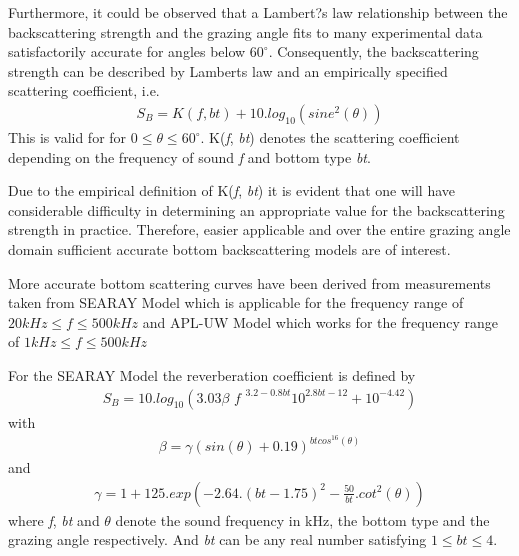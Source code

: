 \noindent Furthermore, it could be observed that a Lambert?s law relationship between the backscattering strength and the grazing angle fits to many experimental data satisfactorily accurate for angles below $60^{\circ}$. Consequently, the backscattering strength can be described by Lambert\textsc{}s law and an empirically specified scattering coefficient, i.e.
\begin{align}
 {S_B}  = K ( \textit{f}, \textit{bt}) + 10 . log_{10}( sine^{2}(\theta)) 
 \end{align}
 \noindent This is valid for for $0 \leq \theta \leq 60^{\circ}$. K(\textit{f}, \textit{bt}) denotes the scattering coefficient depending on the frequency of sound \textit{f} and bottom type \textit{bt}.
 
\noindent Due to the empirical definition of K(\textit{f}, \textit{bt}) it is evident that one will have considerable difficulty in determining an appropriate value for the backscattering strength in practice. Therefore, easier applicable and over the entire grazing angle domain sufficient accurate bottom backscattering models are of interest.

\noindent More accurate bottom scattering curves have been derived from measurements taken from SEARAY Model which is applicable for the frequency range of $20 kHz \leq \textit{f} \leq 500 kHz$ and APL-UW Model which works for the frequency range of $1 kHz \leq \textit{f} \leq 500 kHz$

\noindent For the SEARAY Model the reverberation coefficient is defined by 
\begin{align}
{S_B}  = 10 . log_{10}( 3.03  \beta  \textit{ f } ^{ 3.2 - 0.8 \textit{bt} } 10^{2.8 \textit{bt} - 12} + 10^{-4.42})\end{align}
\noindent with
\begin{align}
\beta = \gamma (sin(\theta) + 0.19)^{\textit{bt}cos^{16}(\theta)}
\end{align}
\noindent and
\begin{align}
\gamma = 1 + 125 . exp( -2.64 . (\textit{bt}-1.75)^{2} - \frac{50}{\textit{bt}} . cot^{2}(\theta))
\end{align}
 \noindent where \textit{f}, \textit{bt} and $\theta$ denote the sound frequency in kHz, the bottom type and the grazing angle respectively. And \textit{bt} can be any real number satisfying $1 \leq \textit{bt} \leq 4.$


